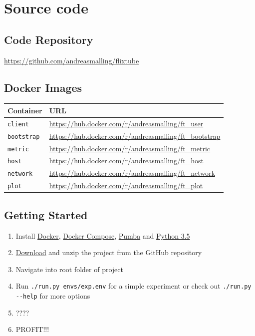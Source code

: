 \chapter{Source code}
\label{app:code}

\section{Code Repository}
\label{app:code_repo}

\url{https://github.com/andreasmalling/flixtube}

\section{Docker Images}
\begin{table}[ht]
\centering
    \begin{tabular}{ll}
        \toprule 
        Container           & URL                                                       \\
        \midrule
        \texttt{client}     & \url{https://hub.docker.com/r/andreasmalling/ft_user}     \\
        \texttt{bootstrap}  & \url{https://hub.docker.com/r/andreasmalling/ft_bootstrap}\\
        \texttt{metric}     & \url{https://hub.docker.com/r/andreasmalling/ft_metric}   \\
        \texttt{host}       & \url{https://hub.docker.com/r/andreasmalling/ft_host}     \\
        \texttt{network}    & \url{https://hub.docker.com/r/andreasmalling/ft_network}  \\
        \texttt{plot}       & \url{https://hub.docker.com/r/andreasmalling/ft_plot}     \\
        \bottomrule
    \end{tabular}
\end{table}

\section{Getting Started}
\label{app:getting_started}

\begin{enumerate}
    \item Install \href{https://docs.docker.com/install/}{Docker}, \href{https://docs.docker.com/compose/install/}{Docker Compose}, \href{https://github.com/alexei-led/pumba/releases}{Pumba} and \href{https://www.python.org/downloads/}{Python 3.5}
    \item \href{https://github.com/andreasmalling/flixtube/archive/master.zip}{Download} and unzip the project from the GitHub repository
    \item Navigate into root folder of project
    \item Run \lstinline[columns=fixed]{./run.py envs/exp.env} for a simple experiment or check out \lstinline[columns=fixed]{./run.py --help} for more options
    \item ????
    \item PROFIT!!!
\end{enumerate}

